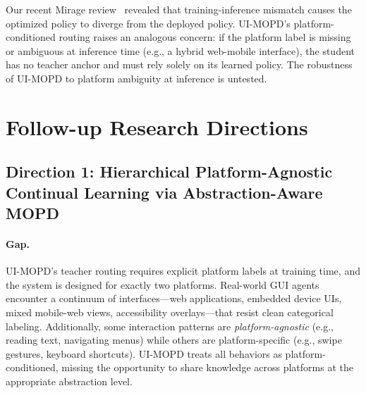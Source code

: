 \documentclass[11pt,a4paper]{article}
\begin{document}
Our recent Mirage review~\cite{mirage2026} revealed that training-inference mismatch causes the optimized policy to diverge from the deployed policy. UI-MOPD's platform-conditioned routing raises an analogous concern: if the platform label is missing or ambiguous at inference time (e.g., a hybrid web-mobile interface), the student has no teacher anchor and must rely solely on its learned policy. The robustness of UI-MOPD to platform ambiguity at inference is untested.

\section{Follow-up Research Directions}

\subsection{Direction 1: Hierarchical Platform-Agnostic Continual Learning via Abstraction-Aware MOPD}

\paragraph{Gap.} UI-MOPD's teacher routing requires explicit platform labels at training time, and the system is designed for exactly two platforms. Real-world GUI agents encounter a continuum of interfaces---web applications, embedded device UIs, mixed mobile-web views, accessibility overlays---that resist clean categorical labeling. Additionally, some interaction patterns are \emph{platform-agnostic} (e.g., reading text, navigating menus) while others are platform-specific (e.g., swipe gestures, keyboard shortcuts). UI-MOPD treats all behaviors as platform-conditioned, missing the opportunity to share knowledge across platforms at the appropriate abstraction level.
\end{document}

